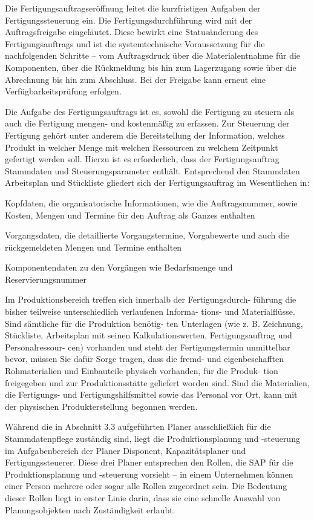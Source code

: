Die Fertigungsauftragseröffnung leitet die kurzfristigen Aufgaben der Fertigungssteuerung ein. 
Die Fertigungsdurchführung wird mit der Auftragsfreigabe eingeläutet. Diese bewirkt eine Statusänderung des Fertigungsauftrags und ist die systemtechnische Voraussetzung für die nachfolgenden Schritte – vom Auftragsdruck über die Materialentnahme für die Komponenten, über die Rückmeldung bis hin zum Lagerzugang sowie über die Abrechnung bis hin zum Abschluss. Bei der Freigabe kann erneut eine Verfügbarkeitsprüfung erfolgen.

Die Aufgabe des Fertigungsauftrags ist es, sowohl die Fertigung zu steuern als auch die Fertigung mengen- und kostenmäßig zu erfassen. Zur Steuerung der Fertigung gehört unter anderem die Bereitstellung der Information, welches Produkt in welcher Menge mit welchen Ressourcen zu welchem Zeitpunkt gefertigt werden soll. Hierzu ist es erforderlich, dass der Fertigungsauftrag Stammdaten und Steuerungsparameter enthält. Entsprechend den Stammdaten Arbeitsplan und Stückliste gliedert sich der Fertigungsauftrag im Wesentlichen in:

Kopfdaten, die organisatorische Informationen, wie die Auftragsnummer, sowie Kosten, Mengen und Termine für den Auftrag als Ganzes enthalten 

Vorgangsdaten, die detaillierte Vorgangstermine, Vorgabewerte und auch die rückgemeldeten Mengen und Termine enthalten 

Komponentendaten zu den Vorgängen wie Bedarfsmenge und Reservierungsnummer

Im Produktionsbereich treffen sich innerhalb der Fertigungsdurch- führung die bisher teilweise unterschiedlich verlaufenen Informa- tions- und Materialflüsse. Sind sämtliche für die Produktion benötig- ten Unterlagen (wie z. B. Zeichnung, Stückliste, Arbeitsplan mit seinen Kalkulationswerten, Fertigungsauftrag und Personalressour- cen) vorhanden und steht der Fertigungstermin unmittelbar bevor, müssen Sie dafür Sorge tragen, dass die fremd- und eigenbeschafften Rohmaterialien und Einbauteile physisch vorhanden, für die Produk- tion freigegeben und zur Produktionsstätte geliefert worden sind. Sind die Materialien, die Fertigungs- und Fertigungshilfsmittel sowie das Personal vor Ort, kann mit der physischen Produkterstellung begonnen werden.

Während die in Abschnitt 3.3 aufgeführten Planer ausschließlich für die Stammdatenpflege zuständig sind, liegt die Produktionsplanung und -steuerung im Aufgabenbereich der Planer Disponent, Kapazitätsplaner und Fertigungssteuerer. Diese drei Planer entsprechen den Rollen, die SAP für die Produktionsplanung und -steuerung vorsieht – in einem Unternehmen können einer Person mehrere oder sogar alle Rollen zugeordnet sein. Die Bedeutung dieser Rollen liegt in erster Linie darin, dass sie eine schnelle Auswahl von Planungsobjekten nach Zuständigkeit erlaubt.

